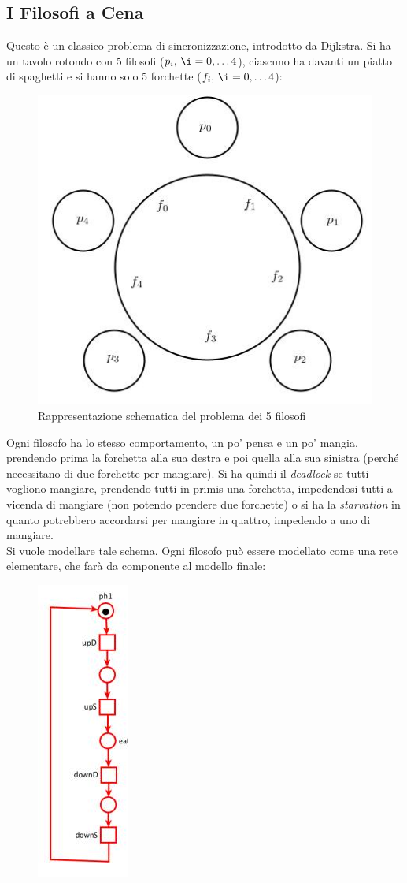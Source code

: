 \documentclass[a4paper,12pt, oneside]{book}
\begin{document}
\subsection{I Filosofi a Cena}
Questo è un classico problema di sincronizzazione, introdotto da Dijkstra. Si ha
un tavolo rotondo con 5 filosofi ($p_i,\,\i=0,\ldots 4$), ciascuno ha davanti un
piatto di spaghetti e si hanno solo 5 forchette ($f_i,\,\i=0,\ldots 4$):
\begin{figure}[H]
  \centering
  \includegraphics[scale = 0.5]{img/pt10.jpg}
  \caption{Rappresentazione schematica del problema dei 5 filosofi}
\end{figure}
Ogni filosofo ha lo stesso comportamento, un po' pensa e un po' mangia,
prendendo prima la forchetta alla sua destra e poi quella alla sua sinistra
(perché necessitano di due forchette per mangiare). Si ha quindi il
\textit{deadlock} se tutti vogliono mangiare, prendendo tutti in primis una
forchetta, impedendosi tutti a vicenda di mangiare (non potendo prendere due
forchette) o si ha la \textit{starvation} in quanto potrebbero accordarsi per
mangiare in quattro, impedendo a uno di mangiare.\\
Si vuole modellare tale schema. Ogni filosofo può essere modellato come una rete
elementare, che farà da componente al modello finale:
\begin{figure}[H]
  \centering
  \includegraphics[scale = 0.5]{img/pt11.jpg}
\end{figure}
\end{document}
